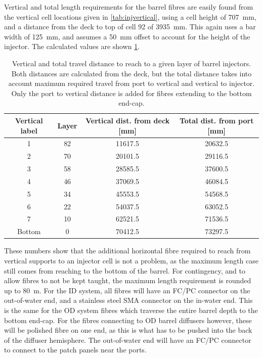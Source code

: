 \documentclass[a4paper,11pt]{article}
\begin{document}
Vertical and total length requirements for the barrel fibres are easily found from the vertical cell locations given in \cref{tab:injvertical}, using a cell height of 707~mm, and a distance from the deck to top of cell 92 of 3935~mm. This again uses a bar width of 125~mm, and assumes a 50~mm offset to account for the height of the injector. The calculated values are shown \cref{tab:barrelLength}.
\begin{table}[h!]
\centering
\begin{tabular}{cccc}\toprule
Vertical label	&	Layer	&	Vertical dist. from deck [mm]	&	Total dist. from port [mm]	\\	\midrule
	1			&	82		&	11617.5							&	20632.5	\\
	2			&	70		&	20101.5							&	29116.5	\\	
	3			&	58		&	28585.5							&	37600.5	\\
	4			&	46		&	37069.5							&	46084.5	\\
	5			&	34		&	45553.5							&	54568.5	\\
	6			&	22		&	54037.5							&	63052.5	\\
	7			&	10		&	62521.5							&	71536.5	\\
	Bottom		&	0		&	70412.5							&	73297.5	\\ \bottomrule
\end{tabular}
\caption{Vertical and total travel distance to reach to a given layer of barrel injectors. Both distances are calculated from the deck, but the total distance takes into account maximum required travel from port to vertical and vertical to injector. Only the port to vertical distance is added for fibres extending to the bottom end-cap.}\label{tab:barrelLength}
\end{table}
These numbers show that the additional horizontal fibre required to reach from vertical supports to an injector cell is not a problem, as the maximum length case still comes from reaching to the bottom of the barrel. For contingency, and to allow fibres to not be kept taught, the maximum length requirement is rounded up to 80~m. For the ID system, all fibres will have an FC/PC connector on the out-of-water end, and a stainless steel SMA connector on the in-water end. This is the same for the OD system fibres which traverse the entire barrel depth to the bottom end-cap. For the fibres connecting to OD barrel diffusers however, these will be polished fibre on one end, as this is what has to be pushed into the back of the diffuser hemisphere. The out-of-water end will have an FC/PC connector to connect to the patch panels near the ports.
\end{document}
